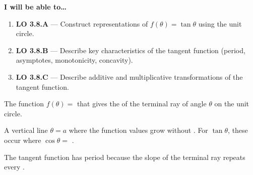\documentclass[10pt]{article}
\begin{document}
\namedateperiod

\vspace{0.08in}

\begin{objectivebox}
\textbf{I will be able to\ldots}
\begin{enumerate}[leftmargin=1.5em, itemsep=4pt]
  \item \textbf{LO 3.8.A} --- Construct representations of $f(\theta)=\tan\theta$
    using the unit circle. \writeline
  \item \textbf{LO 3.8.B} --- Describe key characteristics of the tangent function
    (period, asymptotes, monotonicity, concavity). \writeline
  \item \textbf{LO 3.8.C} --- Describe additive and multiplicative transformations
    of the tangent function. \writeline
\end{enumerate}
\end{objectivebox}

\vspace{0.06in}

\begin{vocabbox}
\begin{description}[leftmargin=0pt, itemsep=6pt]
  \item[\termblanklong{tangent function}]
    The function $f(\theta) = $ \underline{\hspace{2cm}} that gives the
    \underline{\hspace{2.5cm}} of the terminal ray of angle $\theta$ on the unit circle.

  \item[\termblanklong{vertical asymptote}]
    A vertical line $\theta = a$ where the function values grow without
    \underline{\hspace{1.8cm}}.  For $\tan\theta$, these occur where
    $\cos\theta = $ \underline{\hspace{1cm}}.

  \item[\termblanklong{period (tangent)}]
    The tangent function has period \underline{\hspace{1cm}} because the
    slope of the terminal ray repeats every
    \underline{\hspace{2.2cm}}.
\end{description}
\end{vocabbox}
\end{document}
